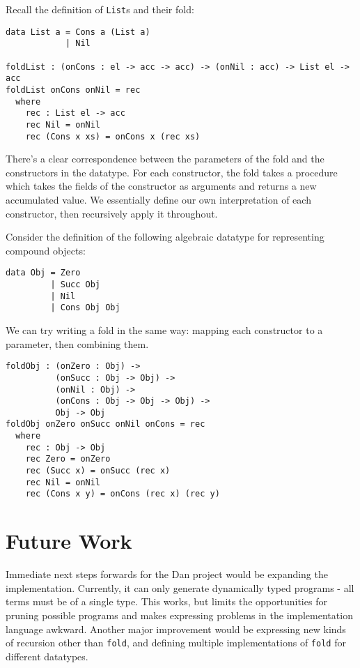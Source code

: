 \documentclass[acmsmall,screen]{acmart}
\begin{document}
Recall the definition of \texttt{List}s and their fold:

\begin{verbatim}
data List a = Cons a (List a)
            | Nil

foldList : (onCons : el -> acc -> acc) -> (onNil : acc) -> List el -> acc
foldList onCons onNil = rec
  where
    rec : List el -> acc
    rec Nil = onNil
    rec (Cons x xs) = onCons x (rec xs)
\end{verbatim}

There's a clear correspondence between the parameters of the fold and the constructors in the datatype. For each constructor, the fold takes a procedure which takes the fields of the constructor as arguments and returns a new accumulated value. We essentially define our own interpretation of each constructor, then recursively apply it throughout.

 Consider the definition of the following algebraic datatype for representing compound objects:

\begin{verbatim}
data Obj = Zero
         | Succ Obj
         | Nil
         | Cons Obj Obj
\end{verbatim}

We can try writing a fold in the same way: mapping each constructor to a parameter, then combining them.

\begin{Verbatim}
foldObj : (onZero : Obj) ->
          (onSucc : Obj -> Obj) ->
          (onNil : Obj) ->
          (onCons : Obj -> Obj -> Obj) ->
          Obj -> Obj
foldObj onZero onSucc onNil onCons = rec
  where
    rec : Obj -> Obj
    rec Zero = onZero
    rec (Succ x) = onSucc (rec x)
    rec Nil = onNil
    rec (Cons x y) = onCons (rec x) (rec y)
\end{Verbatim}

\section{Future Work}

Immediate next steps forwards for the Dan project would be expanding the implementation. Currently, it can only generate dynamically typed programs - all terms must be of a single type. This works, but limits the opportunities for pruning possible programs and makes expressing problems in the implementation language awkward. Another major improvement would be expressing new kinds of recursion other than \texttt{fold}, and defining multiple implementations of \texttt{fold} for different datatypes.
\end{document}
